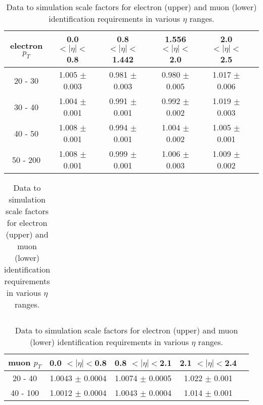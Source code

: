 \begin{table}[h]
\caption{Data to simulation scale factors for electron (upper) and muon (lower)
identification requirements in various $\eta$ ranges.}

\label{eleSF}
\begin{center}
\begin{tabular}{|c|c|c|c|c|c|}
\hline
electron $p_T$     & 0.0 $< |\eta| < $0.8  & 0.8 $< |\eta| < $ 1.442 &  1.556 $< |\eta| < $ 2.0 & 2.0 $< |\eta| < $ 2.5 \\ \hline %
      20 -  30     & 1.005  $\pm$    0.003 & 0.981  $\pm$   0.003    & 0.980 $\pm$ 0.005        & 1.017 $\pm$    0.006  \\ %
      30 -  40     & 1.004  $\pm$    0.001 & 0.991  $\pm$   0.001    & 0.992 $\pm$ 0.002        & 1.019 $\pm$    0.003  \\ %
      40 -  50     & 1.008  $\pm$    0.001 & 0.994  $\pm$   0.001    & 1.004 $\pm$ 0.002        & 1.005 $\pm$    0.001  \\ %
      50 - 200     & 1.008  $\pm$    0.001 & 0.999  $\pm$   0.001    & 1.006 $\pm$ 0.003        & 1.009 $\pm$    0.002  \\ \hline
\end{tabular}

\begin{tabular}{c}
 \\
\end{tabular}

\begin{tabular}{|c|c|c|c|c|}
\hline
muon $p_T$   &  0.0 $< |\eta| < $0.8 & 0.8 $< |\eta| < $2.1 &  2.1 $< |\eta| < $2.4 \\ \hline %
    20 -  40 &  1.0043 $\pm$ 0.0004  &  1.0074 $\pm$ 0.0005 &  1.022 $\pm$ 0.001    \\ %
    40 - 100 &  1.0012 $\pm$ 0.0004  &  1.0043 $\pm$ 0.0004 &  1.014 $\pm$ 0.001    \\ \hline
\end{tabular}
\end{center}
\end{table}


